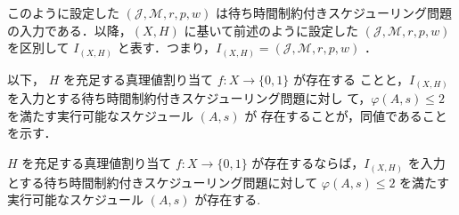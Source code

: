 \documentclass[12pt]{optlab-bachelor}
\begin{document}
このように設定した $(\mathcal{J}, \mathcal{M}, r, p, w)$ は待ち時間制約付きスケジューリング問題の入力である．以降，$(X,H)$ に基いて前述のように設定した $(\mathcal{J}, \mathcal{M}, r, p, w)$ を区別して $I_{(X,H)}$ と表す．つまり，$I_{(X,H)} = (\mathcal{J}, \mathcal{M}, r, p, w)$ ．

以下， $H$ を充足する真理値割り当て $f : X \to \{0,1\}$ が存在する
ことと，$I_{(X,H)}$ を入力とする待ち時間制約付きスケジューリング問題に対し
て，$\varphi(A,s) \le 2$ を満たす実行可能なスケジュール $(A,s)$ が
存在することが，同値であることを示す．

\begin{lemma}\label{l_6}
  $H$ を充足する真理値割り当て $f : X \to \{0,1\}$ が存在するならば，$I_{(X,H)}$ を入力とする待ち時間制約付きスケジューリング問題に対して $\varphi(A,s) \le 2$ を満たす実行可能なスケジュール $(A,s)$ が存在する.
\end{lemma}
\end{document}
